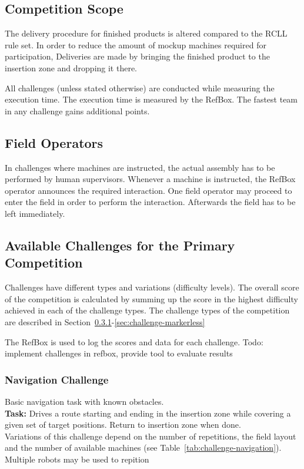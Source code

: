 \documentclass[12pt,twoside]{article}
\newcommand{\refsec}[1]{Section~\ref{#1}}
\newcommand{\reftab}[1]{Table~\ref{#1}}
\begin{document}
\subsection{Competition Scope}

The delivery procedure for finished products is altered compared to the
\ac{RCLL} rule set. In order to reduce the amount of mockup machines required
for participation, Deliveries are made by bringing the finished product
to the insertion zone and dropping it there.

All challenges (unless stated otherwise) are conducted while measuring
the execution time. The execution time is measured by the RefBox.
The fastest team in any challenge gains additional points.

\subsection{Field Operators}
In challenges where machines are instructed, the actual assembly has to be
performed by human supervisors. Whenever a machine is instructed, the RefBox
operator announces the required interaction. One field operator may proceed
to enter the field in order to perform the interaction. Afterwards the field
has to be left immediately.

\subsection{Available Challenges for the Primary Competition}
Challenges have different types and variations (difficulty levels).
The overall score of the competition is calculated by summing up the score
in the highest difficulty achieved in each of the challenge types.
The challenge types of the competition are described in
\refsec{sec:challenge-navigation}-\ref{sec:challenge-markerless}

The RefBox is used to log the scores and data for each challenge.
Todo: implement challenges in refbox, provide tool to evaluate results

\subsubsection{Navigation Challenge}\label{sec:challenge-navigation}
Basic navigation task with known obstacles.\\
\textbf{Task:} Drives a route starting and ending in the insertion zone while
covering a given set of target positions. Return to insertion zone when done.\\
Variations of this challenge depend
on the number of repetitions, the field layout and the number of
available machines (see \reftab{tab:challenge-navigation}).
Multiple robots may be used to repition
\end{document}
